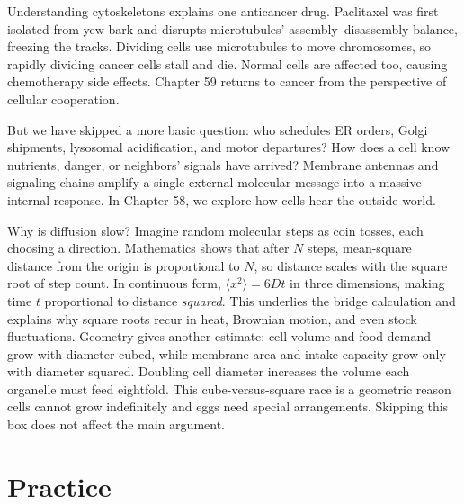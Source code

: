 Understanding cytoskeletons explains one anticancer drug. Paclitaxel was first isolated from yew bark and disrupts microtubules' assembly--disassembly balance, freezing the tracks. Dividing cells use microtubules to move chromosomes, so rapidly dividing cancer cells stall and die. Normal cells are affected too, causing chemotherapy side effects. Chapter 59 returns to cancer from the perspective of cellular cooperation.

But we have skipped a more basic question: who schedules ER orders, Golgi shipments, lysosomal acidification, and motor departures? How does a cell know nutrients, danger, or neighbors' signals have arrived? Membrane antennas and signaling chains amplify a single external molecular message into a massive internal response. In Chapter 58, we explore how cells hear the outside world.

\begin{tiaozhan}
Why is diffusion slow? Imagine random molecular steps as coin tosses, each choosing a direction. Mathematics shows that after $N$ steps, mean-square distance from the origin is proportional to $N$, so distance scales with the square root of step count. In continuous form, $\langle x^2\rangle = 6Dt$ in three dimensions, making time $t$ proportional to distance \emph{squared}. This underlies the bridge calculation and explains why square roots recur in heat, Brownian motion, and even stock fluctuations. Geometry gives another estimate: cell volume and food demand grow with diameter cubed, while membrane area and intake capacity grow only with diameter squared. Doubling cell diameter increases the volume each organelle must feed eightfold. This cube-versus-square race is a geometric reason cells cannot grow indefinitely and eggs need special arrangements. Skipping this box does not affect the main argument.
\end{tiaozhan}

\section*{Practice}


